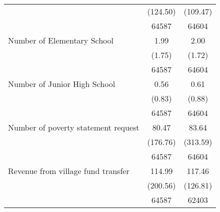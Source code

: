 \begin{tabular}{l*{2}{c}}
                    &    (124.50)&    (109.47)\\
                    &       64587&       64604\\
[1em]
Number of Elementary School&        1.99&        2.00\\
                    &      (1.75)&      (1.72)\\
                    &       64587&       64604\\
[1em]
Number of Junior High School&        0.56&        0.61\\
                    &      (0.83)&      (0.88)\\
                    &       64587&       64604\\
[1em]
Number of poverty statement request&       80.47&       83.64\\
                    &    (176.76)&    (313.59)\\
                    &       64587&       64604\\
[1em]
Revenue from village fund transfer&      114.99&      117.46\\
                    &    (200.56)&    (126.81)\\
                    &       64587&       62403\\
\hline\hline
\end{tabular}
